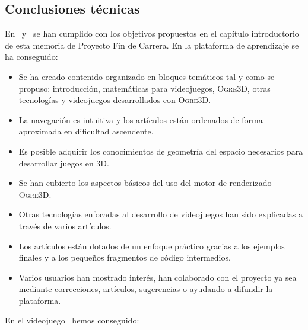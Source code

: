\documentclass[a4paper,11pt]{article}
\begin{document}
\subsection{Conclusiones técnicas}

\noindent En \wiki\ y \juego\ se han cumplido con los objetivos propuestos en el
capítulo introductorio de esta memoria de Proyecto Fin de Carrera. En la
plataforma de aprendizaje se ha conseguido:

\begin{itemize}
    \itemsep0em
    \item Se ha creado contenido organizado en bloques temáticos tal y como
    se propuso: introducción, matemáticas para videojuegos, \textsc{Ogre3D},
    otras tecnologías y videojuegos desarrollados con \textsc{Ogre3D}.
    \item La navegación es intuitiva y los artículos están ordenados
    de forma aproximada en dificultad ascendente.
    \item Es posible adquirir los conocimientos de geometría del espacio
    necesarios para desarrollar juegos en 3D.
    \item Se han cubierto los aspectos básicos del uso del motor de renderizado
    \textsc{Ogre3D}.
    \item Otras tecnologías enfocadas al desarrollo de videojuegos han sido
    explicadas a través de varios artículos.
    \item Los artículos están dotados de un enfoque práctico gracias a los
    ejemplos finales y a los pequeños fragmentos de código intermedios.
    \item Varios usuarios han mostrado interés, han colaborado con el proyecto
    ya sea mediante correcciones, artículos, sugerencias o ayudando a difundir
    la plataforma.
\end{itemize}

\noindent En el videojuego \juego\ hemos conseguido:
\end{document}
